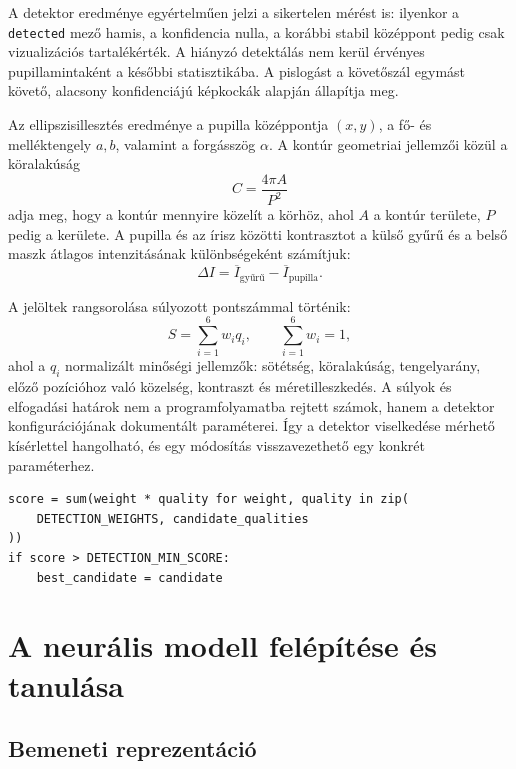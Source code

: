 \documentclass[12pt,a4paper,oneside]{book}
\begin{document}
A detektor eredménye egyértelműen jelzi a sikertelen mérést is: ilyenkor a \texttt{detected} mező hamis, a konfidencia nulla, a korábbi stabil középpont pedig csak vizualizációs tartalékérték. A hiányzó detektálás nem kerül érvényes pupillamintaként a későbbi statisztikába. A pislogást a követőszál egymást követő, alacsony konfidenciájú képkockák alapján állapítja meg.

Az ellipszisillesztés eredménye a pupilla középpontja $(x,y)$, a fő- és melléktengely $a,b$, valamint a forgásszög $\alpha$. A kontúr geometriai jellemzői közül a köralakúság
{\large
\begin{equation}
    C = \frac{4\pi A}{P^2}
\end{equation}
}%
adja meg, hogy a kontúr mennyire közelít a körhöz, ahol $A$ a kontúr területe, $P$ pedig a kerülete. A pupilla és az írisz közötti kontrasztot a külső gyűrű és a belső maszk átlagos intenzitásának különbségeként számítjuk:
{\large
\begin{equation}
    \Delta I = \overline{I}_{\mathrm{gyűrű}} -
    \overline{I}_{\mathrm{pupilla}}.
\end{equation}
}%

A jelöltek rangsorolása súlyozott pontszámmal történik:
{\large
\begin{equation}
    S = \sum_{i=1}^{6} w_i q_i,
    \qquad \sum_{i=1}^{6}w_i=1,
\end{equation}
}%
ahol a $q_i$ normalizált minőségi jellemzők: sötétség, köralakúság, tengelyarány, előző pozícióhoz való közelség, kontraszt és méretilleszkedés. A súlyok és elfogadási határok nem a programfolyamatba rejtett számok, hanem a detektor konfigurációjának dokumentált paraméterei. Így a detektor viselkedése mérhető kísérlettel hangolható, és egy módosítás visszavezethető egy konkrét paraméterhez.

\begin{lstlisting}[caption={Paraméterezett pupillajelölt-pontszámítás},label={lst:pupil_score}]
score = sum(weight * quality for weight, quality in zip(
    DETECTION_WEIGHTS, candidate_qualities
))
if score > DETECTION_MIN_SCORE:
    best_candidate = candidate
\end{lstlisting}

\section{A neurális modell felépítése és tanulása}

\subsection{Bemeneti reprezentáció}
\end{document}
